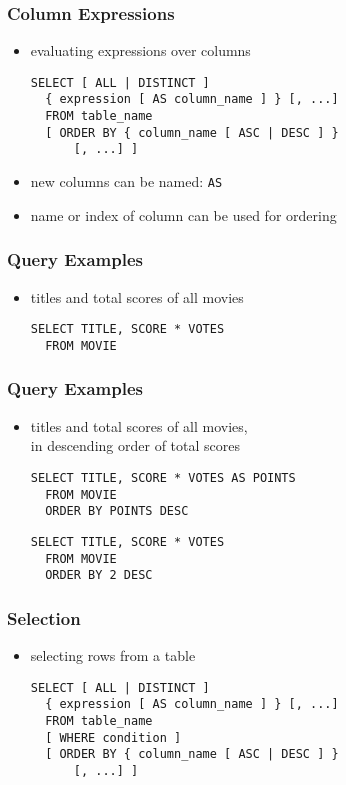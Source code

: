 \documentclass[dvipsnames]{beamer}
\theoremstyle{plain}
\begin{document}
\begin{frame}[fragile]
  \frametitle{Column Expressions}

  \begin{itemize}
    \item evaluating expressions over columns
    \begin{lstlisting}
SELECT [ ALL | DISTINCT ]
  { expression [ AS column_name ] } [, ...]
  FROM table_name
  [ ORDER BY { column_name [ ASC | DESC ] }
      [, ...] ]
    \end{lstlisting}

    \medskip
    \item new columns can be named: \lstinline!AS!
    \item name or index of column can be used for ordering
  \end{itemize}
\end{frame}

\begin{frame}[fragile]
  \frametitle{Query Examples}

  \begin{itemize}
    \item titles and total scores of all movies
    \begin{lstlisting}
SELECT TITLE, SCORE * VOTES
  FROM MOVIE
    \end{lstlisting}
  \end{itemize}
\end{frame}

\begin{frame}[fragile]
  \frametitle{Query Examples}

  \begin{itemize}
    \item titles and total scores of all movies,\\
      in descending order of total scores
    \begin{lstlisting}
SELECT TITLE, SCORE * VOTES AS POINTS
  FROM MOVIE
  ORDER BY POINTS DESC
    \end{lstlisting}

    \pause
    \begin{lstlisting}
SELECT TITLE, SCORE * VOTES
  FROM MOVIE
  ORDER BY 2 DESC
    \end{lstlisting}
  \end{itemize}
\end{frame}

\begin{frame}[fragile]
  \frametitle{Selection}

  \begin{itemize}
    \item selecting rows from a table
    \begin{lstlisting}
SELECT [ ALL | DISTINCT ]
  { expression [ AS column_name ] } [, ...]
  FROM table_name
  [ WHERE condition ]
  [ ORDER BY { column_name [ ASC | DESC ] }
      [, ...] ]
    \end{lstlisting}
  \end{itemize}
\end{frame}
\end{document}
